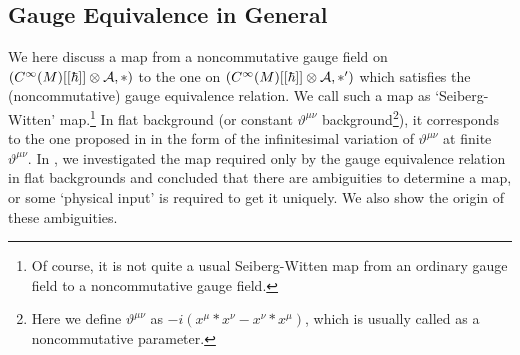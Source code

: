 \documentclass[10pt,a4paper]{article}
\def\h{\hbar}
\begin{document}
\subsection{Gauge Equivalence in General
\label{sec:gegc}}

We here discuss a map from a noncommutative gauge field on $(C^\infty(M)[[\h]]\otimes {\cal A},*)$ to the one on $(C^\infty(M)[[\h]]\otimes {\cal A},*')$
which satisfies the (noncommutative) gauge equivalence relation. We call such a map as `Seiberg-Witten' map.\footnote{
	Of course, it is not quite a usual Seiberg-Witten map from an ordinary gauge field to a noncommutative gauge field.
}
In flat background (or constant $\vartheta^{\mu\nu}$ background\footnote{
        Here we define $\vartheta^{\mu\nu}$ as  $-i(x^\mu*x^\nu-x^\nu*x^\mu)$, which is usually called as a noncommutative parameter.
}), it corresponds to the one proposed in \cite{SW} in the form of the infinitesimal variation of  $\vartheta^{\mu\nu}$ at finite $\vartheta^{\mu\nu}$.
In \cite{AK}, we investigated the map required only by the gauge equivalence relation in flat backgrounds and concluded that there are ambiguities to determine a map, or some `physical input' is required to get it uniquely.
We also show the origin of these ambiguities.\\
\end{document}
